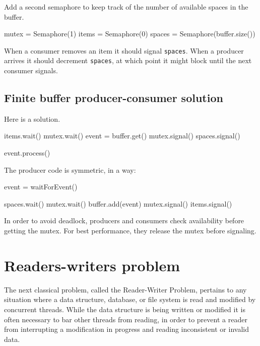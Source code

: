 \documentclass{book}
\begin{document}
Add a second semaphore to keep track of the number of
available spaces in the buffer.

\begin{unbreakable}[title={Finite-buffer producer-consumer initialization}]{}
mutex = Semaphore(1)
items = Semaphore(0)
spaces = Semaphore(buffer.size())
\end{unbreakable}

When a consumer removes an item it should signal {\tt spaces}.
When a producer arrives it should decrement {\tt spaces}, at
which point it might block until the next consumer signals.



\subsection{Finite buffer producer-consumer solution}

Here is a solution.

\begin{unbreakable}[title={Finite buffer consumer solution}]{}
items.wait()
mutex.wait()
    event = buffer.get()
mutex.signal()
spaces.signal()

event.process()
\end{unbreakable}

The producer code is symmetric, in a way:

\begin{unbreakable}[title={Finite buffer producer solution}]{}
event = waitForEvent()

spaces.wait()
mutex.wait()
    buffer.add(event)
mutex.signal()
items.signal()
\end{unbreakable}

In order to avoid deadlock, producers and consumers check
availability before getting the mutex.  For best performance,
they release the mutex before signaling.


\section{Readers-writers problem}

The next classical problem, called the Reader-Writer Problem, pertains
to any situation where a data structure, database, or file system is
read and modified by concurrent threads.  While the data structure is
being written or modified it is often necessary to bar other threads
from reading, in order to prevent a reader from interrupting a
modification in progress and reading inconsistent or invalid data.
\end{document}
